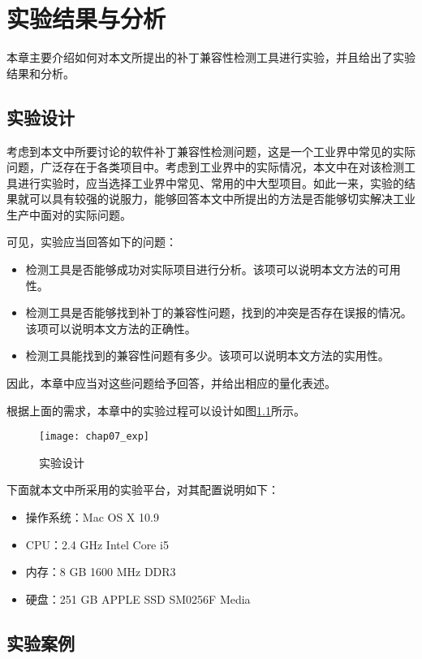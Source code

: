 \chapter{实验结果与分析}
\label {exp}
本章主要介绍如何对本文所提出的补丁兼容性检测工具进行实验，并且给出了实验结果和分析。

\section{实验设计}
\label {exp_des}

考虑到本文中所要讨论的软件补丁兼容性检测问题，这是一个工业界中常见的实际问题，广泛存在于各类项目中。考虑到工业界中的实际情况，本文中在对该检测工具进行实验时，应当选择工业界中常见、常用的中大型项目。如此一来，实验的结果就可以具有较强的说服力，能够回答本文中所提出的方法是否能够切实解决工业生产中面对的实际问题。

可见，实验应当回答如下的问题：
\begin{itemize}
	\item 检测工具是否能够成功对实际项目进行分析。该项可以说明本文方法的可用性。
	\item 检测工具是否能够找到补丁的兼容性问题，找到的冲突是否存在误报的情况。该项可以说明本文方法的正确性。
	\item 检测工具能找到的兼容性问题有多少。该项可以说明本文方法的实用性。
\end{itemize}

因此，本章中应当对这些问题给予回答，并给出相应的量化表述。

根据上面的需求，本章中的实验过程可以设计如图\ref {des_exp}所示。

\begin{figure}[H]
	\centering
	\texttt{[image: chap07\_exp]}
	\caption {实验设计}
	\label {des_exp}	
\end{figure}


下面就本文中所采用的实验平台，对其配置说明如下：
\begin{itemize}
	\item 操作系统：Mac OS X 10.9
	\item CPU：2.4 GHz Intel Core i5
	\item 内存：8 GB 1600 MHz DDR3
	\item 硬盘：251 GB APPLE SSD SM0256F Media
\end{itemize}

\section{实验案例}
\label {exp_data}

